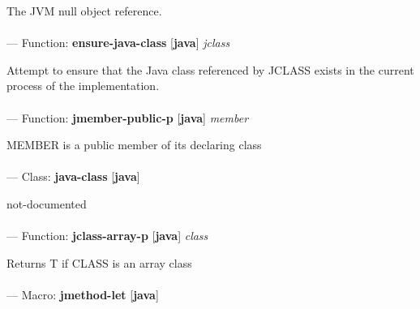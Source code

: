 \begin{adjustwidth}{5em}{5em}
The JVM null object reference.
\end{adjustwidth}

\paragraph{}
\label{JAVA:ENSURE-JAVA-CLASS}
--- Function: \textbf{ensure-java-class} [\textbf{java}] \textit{jclass}

\begin{adjustwidth}{5em}{5em}
Attempt to ensure that the Java class referenced by JCLASS exists in the current process of the implementation.
\end{adjustwidth}

\paragraph{}
\label{JAVA:JMEMBER-PUBLIC-P}
--- Function: \textbf{jmember-public-p} [\textbf{java}] \textit{member}

\begin{adjustwidth}{5em}{5em}
MEMBER is a public member of its declaring class
\end{adjustwidth}

\paragraph{}
\label{JAVA:JAVA-CLASS}
--- Class: \textbf{java-class} [\textbf{java}] \textit{}

\begin{adjustwidth}{5em}{5em}
not-documented
\end{adjustwidth}

\paragraph{}
\label{JAVA:JCLASS-ARRAY-P}
--- Function: \textbf{jclass-array-p} [\textbf{java}] \textit{class}

\begin{adjustwidth}{5em}{5em}
Returns T if CLASS is an array class
\end{adjustwidth}

\paragraph{}
\label{JAVA:JMETHOD-LET}
--- Macro: \textbf{jmethod-let} [\textbf{java}] \textit{}

